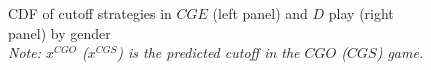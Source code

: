\documentclass[11pt,english]{article}
\begin{document}
\begin{center}
\begin{figure}[ht]
\centering{}%
\begin{minipage}[t]{0.45\columnwidth}%
%
\end{minipage}%
\begin{minipage}[t]{0.45\columnwidth}%
%
\end{minipage} 
\caption{CDF of cutoff strategies in $CGE$ (left panel) and $D$ play (right panel) by gender\\ \footnotesize{\textit{Note: $x^{CGO}$ ($x^{CGS}$) is the predicted cutoff in the $CGO$ ($CGS$) game.}}}
\label{fig:cdfgender2}\end{figure}
\par\end{center}
\end{document}
